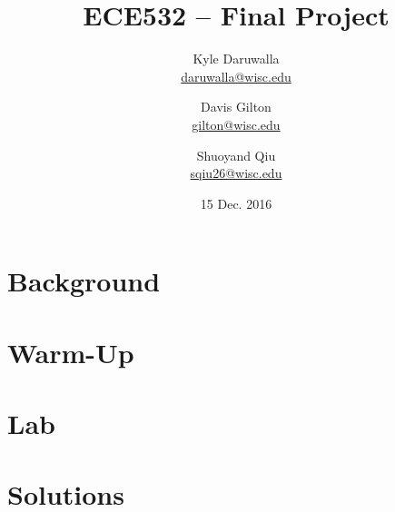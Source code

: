 \documentclass{report}
\title{ECE532 -- Final Project}
\author{Kyle Daruwalla \\ \href{mailto:daruwalla@wisc.edu}{daruwalla@wisc.edu}
    \and Davis Gilton \\ \href{mailto:gilton@wisc.edu}{gilton@wisc.edu}
    \and Shuoyand Qiu \\ \href{mailto:sqiu26@wisc.edu}{sqiu26@wisc.edu}
}
\date{15 Dec. 2016}
\renewcommand\appendix{\par
  \setcounter{section}{0}
  \setcounter{subsection}{0}
  \setcounter{figure}{0}
  \setcounter{table}{0}
  \renewcommand\thesection{Appendix \Alph{section}}
  \renewcommand\thefigure{\Alph{section}\arabic{figure}}
  \renewcommand\thetable{\Alph{section}\arabic{table}}
}
\begin{document}
\maketitle

\begin{abstract}
    
\end{abstract}

\section{Background}
\label{sec:background}


\section{Warm-Up}
\label{sec:warm-up}


\section{Lab}
\label{sec:lab}


\newpage
\nocite{*}


\newpage
\appendix
\section{Solutions}
\label{app:solutions}

\end{document}
